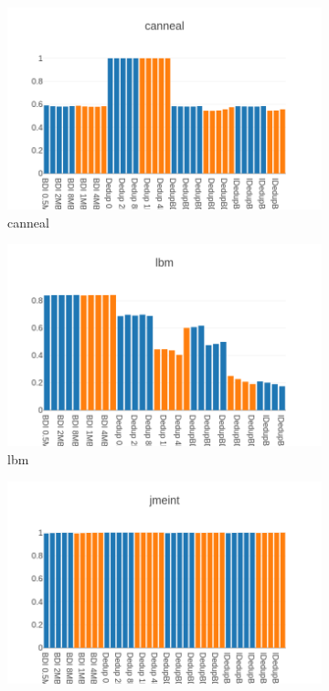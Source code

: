 \begin{figure}
    \begin{subfigure}{0.5\textwidth}
        \includegraphics[width=\textwidth]{canneal-compratio.png}
        \caption{canneal}
    \end{subfigure}
    \begin{subfigure}{0.5\textwidth}
        \includegraphics[width=\textwidth]{lbm-compratio.png}
        \caption{lbm}
    \end{subfigure}
    \begin{subfigure}{0.5\textwidth}
        \includegraphics[width=\textwidth]{jmeint-compratio.png}

\end{subfigure}
\end{figure}
